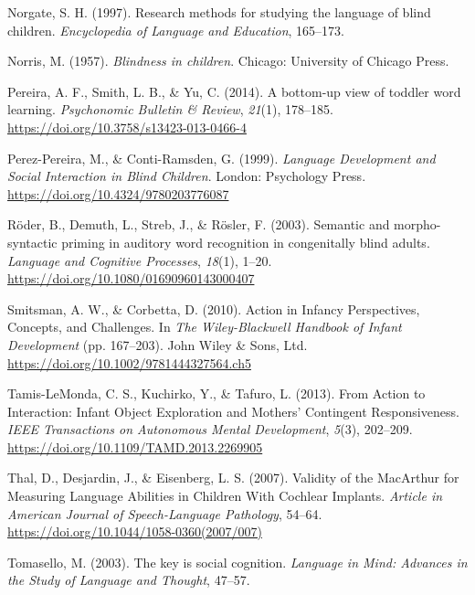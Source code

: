 \documentclass[
  man,floatsintext]{apa6}
\newlength{\cslhangindent}
\newlength{\cslentryspacingunit} %
\newenvironment{CSLReferences}[2] %
 {%
  \setlength{\parindent}{0pt}
  \ifodd #1
  \let\oldpar\par
  \def\par{\hangindent=\cslhangindent\oldpar}
  \fi
  \setlength{\parskip}{#2\cslentryspacingunit}
 }%
 {}
\begin{document}
\begin{CSLReferences}{1}{0}
\leavevmode{}%
Norgate, S. H. (1997). Research methods for studying the language of blind children. \emph{Encyclopedia of Language and Education}, 165--173.

\leavevmode{}%
Norris, M. (1957). \emph{Blindness in children}. {Chicago}: {University of Chicago Press}.

\leavevmode{}%
Pereira, A. F., Smith, L. B., \& Yu, C. (2014). A bottom-up view of toddler word learning. \emph{Psychonomic Bulletin \& Review}, \emph{21}(1), 178--185. \url{https://doi.org/10.3758/s13423-013-0466-4}

\leavevmode{}%
Perez-Pereira, M., \& Conti-Ramsden, G. (1999). \emph{Language {Development} and {Social Interaction} in {Blind Children}}. {London}: {Psychology Press}. \url{https://doi.org/10.4324/9780203776087}

\leavevmode{}%
Röder, B., Demuth, L., Streb, J., \& Rösler, F. (2003). Semantic and morpho-syntactic priming in auditory word recognition in congenitally blind adults. \emph{Language and Cognitive Processes}, \emph{18}(1), 1--20. \url{https://doi.org/10.1080/01690960143000407}

\leavevmode{}%
Smitsman, A. W., \& Corbetta, D. (2010). Action in {Infancy} \textendash{} {Perspectives}, {Concepts}, and {Challenges}. In \emph{The {Wiley-Blackwell Handbook} of {Infant Development}} (pp. 167--203). {John Wiley \& Sons, Ltd}. \url{https://doi.org/10.1002/9781444327564.ch5}

\leavevmode{}%
Tamis-LeMonda, C. S., Kuchirko, Y., \& Tafuro, L. (2013). From {Action} to {Interaction}: {Infant Object Exploration} and {Mothers}' {Contingent Responsiveness}. \emph{IEEE Transactions on Autonomous Mental Development}, \emph{5}(3), 202--209. \url{https://doi.org/10.1109/TAMD.2013.2269905}

\leavevmode{}%
Thal, D., Desjardin, J., \& Eisenberg, L. S. (2007). Validity of the {MacArthur} for {Measuring Language Abilities} in {Children With Cochlear Implants}. \emph{Article in American Journal of Speech-Language Pathology}, 54--64. \url{https://doi.org/10.1044/1058-0360(2007/007)}

\leavevmode{}%
Tomasello, M. (2003). The key is social cognition. \emph{Language in Mind: Advances in the Study of Language and Thought}, 47--57.


\end{CSLReferences}
\end{document}
